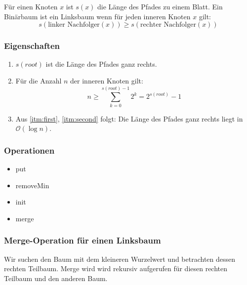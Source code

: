 Für einen Knoten \(x\) ist \(s(x)\) die Länge des Pfades zu einem Blatt.
Ein Binärbaum ist ein Linksbaum wenn für jeden inneren Knoten \(x\) gilt:
\[s(\textrm{linker Nachfolger}(x)) \geq s(\textrm{rechter Nachfolger}(x)) \]

\subsubsection{Eigenschaften}
\begin{enumerate}
	\item \label{itm:first} \(s(root)\) ist die Länge des Pfades ganz rechts.
	\item \label{itm:second} Für die Anzahl \(n\) der inneren Knoten  gilt:
		\[ n\geq \sum \limits_{k=0}^{s(root)-1} 2^{k} = 2^{s(root)}-1\]
	\item Aus \ref{itm:first}, \ref{itm:second} folgt: Die Länge des Pfades ganz rechts liegt in \(\mathcal{O}(\log n)\).
\end{enumerate}

\subsubsection{Operationen}
\begin{itemize}
	\item put
	\item removeMin
	\item init
	\item merge
\end{itemize}

\subsubsection{Merge-Operation für einen Linksbaum}
Wir suchen den Baum mit dem kleineren Wurzelwert und betrachten dessen rechten Teilbaum.
Merge wird wird rekursiv aufgerufen für diesen rechten Teilbaum und den anderen Baum.

